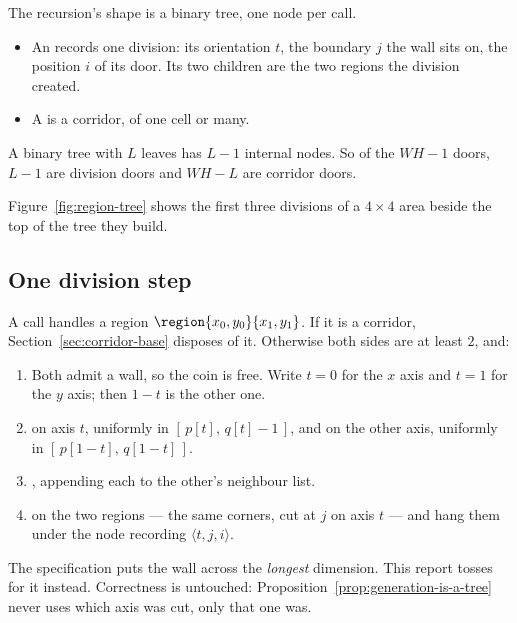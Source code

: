 The recursion's shape is a binary tree, one node per call.

\begin{itemize}[leftmargin=*,itemsep=3pt]
  \item An  records one division: its orientation $t$,
        the boundary $j$ the wall sits on, the position $i$ of its door. Its two
        children are the two regions the division created.
  \item A  is a corridor, of one cell or many.
\end{itemize}

A binary tree with $L$ leaves has $L-1$ internal nodes. So of the $WH-1$ doors,
$L-1$ are division doors and $WH-L$ are corridor doors.

Figure~\ref{fig:region-tree} shows the first three divisions of a $4\times4$
area beside the top of the tree they build.



\subsection{One division step}

A call handles a region $\region{x_0,y_0}{x_1,y_1}$. If it is a corridor,
Section~\ref{sec:corridor-base} disposes of it. Otherwise both sides are at
least $2$, and:

\begin{enumerate}[leftmargin=*,itemsep=4pt]
  \item {} Both admit a wall, so the coin
        is free. Write $t=0$ for the $x$ axis and $t=1$ for the $y$ axis; then
        $1-t$ is the other one.
  \item {} on axis $t$, uniformly in
        $[\,p[t],\,q[t]-1\,]$, and  on the other
        axis, uniformly in $[\,p[1-t],\,q[1-t]\,]$.
  \item {}, appending each to the
        other's neighbour list.
  \item {} on the two regions --- the same corners, cut at $j$ on
        axis $t$ --- and hang them under the node recording $\langle
        t,j,i\rangle$.
\end{enumerate}

\begin{remark}
The specification puts the wall across the \emph{longest} dimension. This report
tosses for it instead. Correctness is untouched:
Proposition~\ref{prop:generation-is-a-tree} never uses which axis was cut, only
that one was.
\end{remark}

